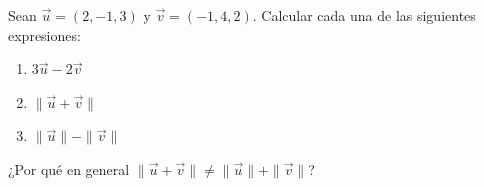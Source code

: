 Sean $\vec{u} = (2, -1, 3)$ y $\vec{v} = (-1, 4, 2)$. Calcular cada una de las siguientes expresiones:
\begin{enumerate}
    \item $3\vec{u} - 2\vec{v}$
    \item $\|\vec{u} + \vec{v}\|$
    \item $\|\vec{u}\| - \|\vec{v}\|$
\end{enumerate}
¿Por qué en general $\|\vec{u} + \vec{v}\| \neq \|\vec{u}\| + \|\vec{v}\|$?